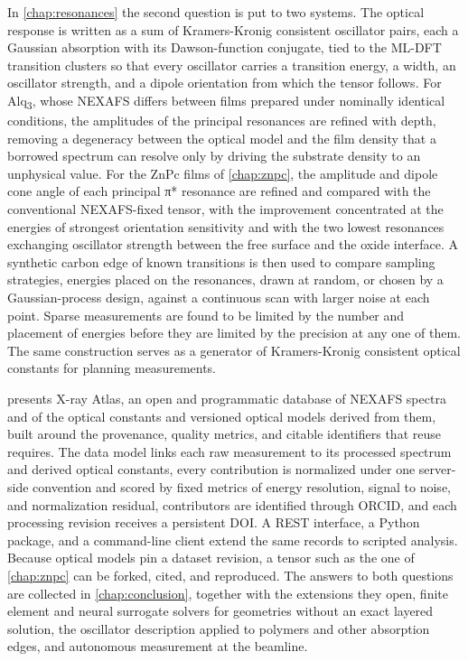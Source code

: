 In \cref{chap:resonances} the second question is put to two systems. The optical response is written as a sum of Kramers-Kronig consistent oscillator pairs, each a Gaussian absorption with its Dawson-function conjugate, tied to the ML-DFT transition clusters so that every oscillator carries a transition energy, a width, an oscillator strength, and a dipole orientation from which the tensor follows. For Alq\textsubscript{3}, whose NEXAFS differs between films prepared under nominally identical conditions, the amplitudes of the principal resonances are refined with depth, removing a degeneracy between the optical model and the film density that a borrowed spectrum can resolve only by driving the substrate density to an unphysical value. For the ZnPc films of \cref{chap:znpc}, the amplitude and dipole cone angle of each principal π* resonance are refined and compared with the conventional NEXAFS-fixed tensor, with the improvement concentrated at the energies of strongest orientation sensitivity and with the two lowest resonances exchanging oscillator strength between the free surface and the oxide interface. A synthetic carbon edge of known transitions is then used to compare sampling strategies, energies placed on the resonances, drawn at random, or chosen by a Gaussian-process design, against a continuous scan with larger noise at each point. Sparse measurements are found to be limited by the number and placement of energies before they are limited by the precision at any one of them. The same construction serves as a generator of Kramers-Kronig consistent optical constants for planning measurements.

 presents X-ray Atlas, an open and programmatic database of NEXAFS spectra and of the optical constants and versioned optical models derived from them, built around the provenance, quality metrics, and citable identifiers that reuse requires. The data model links each raw measurement to its processed spectrum and derived optical constants, every contribution is normalized under one server-side convention and scored by fixed metrics of energy resolution, signal to noise, and normalization residual, contributors are identified through ORCID, and each processing revision receives a persistent DOI. A REST interface, a Python package, and a command-line client extend the same records to scripted analysis. Because optical models pin a dataset revision, a tensor such as the one of \cref{chap:znpc} can be forked, cited, and reproduced. The answers to both questions are collected in \cref{chap:conclusion}, together with the extensions they open, finite element and neural surrogate solvers for geometries without an exact layered solution, the oscillator description applied to polymers and other absorption edges, and autonomous measurement at the beamline.
